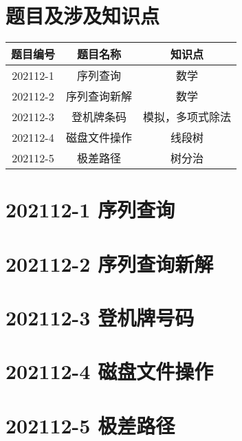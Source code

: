 \documentclass[cn,10pt,math=newtx,citestyle=gb7714-2015,bibstyle=gb7714-2015]{elegantbook}
\newif\ifonlyanalyze %
\begin{document}
\section{题目及涉及知识点}

\begin{table}[htbp]
  \centering
  \begin{tabular}{ccc}
    \toprule
    题目编号 & 题目名称     & 知识点           \\
    \midrule
    202112-1 & 序列查询     & 数学             \\
    202112-2 & 序列查询新解 & 数学             \\
    202112-3 & 登机牌条码   & 模拟，多项式除法 \\
    202112-4 & 磁盘文件操作 & 线段树           \\
    202112-5 & 极差路径     & 树分治           \\
    \bottomrule
  \end{tabular}
\end{table}

\newpage
\section{202112-1 序列查询}
\ifonlyanalyze
\else
  
\fi


\newpage
\section{202112-2 序列查询新解}
\ifonlyanalyze
\else
  
\fi


\newpage
\section{202112-3 登机牌号码}
\ifonlyanalyze
\else
  
\fi


\newpage
\section{202112-4 磁盘文件操作}
\ifonlyanalyze
\else
  
\fi


\newpage
\section{202112-5 极差路径}
\ifonlyanalyze
\else
  
\fi

\end{document}
